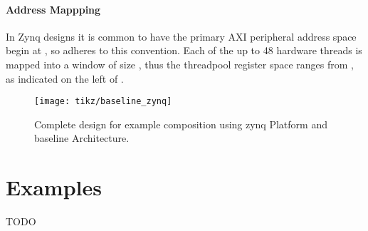 \paragraph{Address Mappping}
In Zynq designs it is common to have the primary AXI peripheral address space begin at , so  adheres to this convention.
Each of the up to 48 hardware threads is mapped into a window of size , thus the threadpool register space ranges from , as indicated on the left of .

%
\begin{sidewaysfigure}[p]
  \centering%
  \texttt{[image: tikz/baseline\_zynq]}
  \caption{Complete design for example composition using zynq Platform and baseline Architecture.}
  \label{fig:baseline-zynq}
\end{sidewaysfigure}
%

\section{Examples}\label{sec:examples}
TODO
